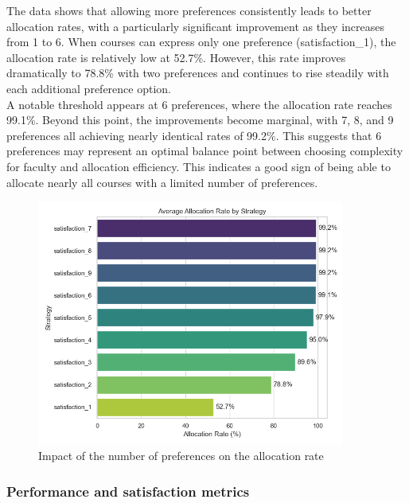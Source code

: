 \documentclass[a4paper, oneside]{article}
\theoremstyle{plain}
\begin{document}
\begin{minipage}{0.4\textwidth}
	The data shows that allowing more preferences consistently leads to better allocation rates, with a particularly significant improvement as they increases from 1 to 6.
	When courses can express only one preference (satisfaction\_1), the allocation rate is relatively low at 52.7\%. However, this rate improves dramatically to 78.8\% with two preferences and
	continues to rise steadily with each additional preference option.\\

	A notable threshold appears at 6 preferences, where the allocation rate reaches 99.1\%. Beyond this point, the improvements become marginal, with 7, 8, and 9 preferences all achieving nearly
	identical rates of 99.2\%. This suggests that 6 preferences may represent an optimal balance point between choosing complexity for faculty and allocation efficiency. This indicates a
	good sign of being able to allocate nearly all courses with a limited number of preferences.
\end{minipage}
\hfill
\begin{minipage}{0.55\textwidth}
	\begin{figure}[H]
		\centering
		\includegraphics[width=0.9\textwidth]{images/strategy_comparison.png}
		\caption{Impact of the number of preferences on the allocation rate}
	\end{figure}
\end{minipage}

\subsubsection*{Performance and satisfaction metrics}
\end{document}
